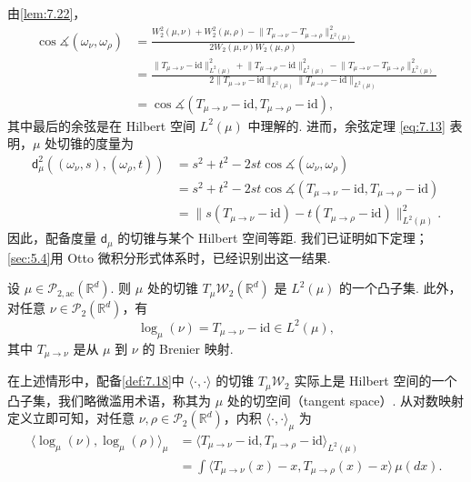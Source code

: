 由\autoref{lem:7.22}，
\begin{equation}\label{eq:7.17}
\begin{aligned}
\cos\measuredangle(\omega_\nu,\omega_\rho)
&=\frac{W_2^2(\mu,\nu)+W_2^2(\mu,\rho)-\lVert T_{\mu\to\nu}-T_{\mu\to\rho}\rVert_{L^2(\mu)}^2}{2W_2(\mu,\nu)W_2(\mu,\rho)}\\
&=\frac{\lVert T_{\mu\to\nu}-\mathrm{id}\rVert_{L^2(\mu)}^2+\lVert T_{\mu\to\rho}-\mathrm{id}\rVert_{L^2(\mu)}^2-\lVert T_{\mu\to\nu}-T_{\mu\to\rho}\rVert_{L^2(\mu)}^2}{2\lVert T_{\mu\to\nu}-\mathrm{id}\rVert_{L^2(\mu)}\lVert T_{\mu\to\rho}-\mathrm{id}\rVert_{L^2(\mu)}}\\
&=\cos\measuredangle(T_{\mu\to\nu}-\mathrm{id},T_{\mu\to\rho}-\mathrm{id}),
\end{aligned}
\end{equation}
其中最后的余弦是在 Hilbert 空间 $L^2(\mu)$ 中理解的. 进而，余弦定理 \eqref{eq:7.13} 表明，$\mu$ 处切锥的度量为
$$\begin{aligned}
\mathsf d_\mu^2((\omega_\nu,s),(\omega_\rho,t))
&=s^2+t^2-2st\cos\measuredangle(\omega_\nu,\omega_\rho)\\
&=s^2+t^2-2st\cos\measuredangle(T_{\mu\to\nu}-\mathrm{id},T_{\mu\to\rho}-\mathrm{id})\\
&=\lVert s(T_{\mu\to\nu}-\mathrm{id})-t(T_{\mu\to\rho}-\mathrm{id})\rVert_{L^2(\mu)}^2.
\end{aligned}$$
因此，配备度量 $\mathsf d_\mu$ 的切锥与某个 Hilbert 空间等距. 我们已证明如下定理；\autoref{sec:5.4}用 Otto 微积分形式体系时，已经识别出这一结果.
\begin{theorem}\label{thm:7.23}
设 $\mu\in\mathcal P_{2,\mathrm{ac}}(\mathbb R^d)$. 则 $\mu$ 处的切锥 $T_\mu\mathcal W_2(\mathbb R^d)$ 是 $L^2(\mu)$ 的一个凸子集. 此外，对任意 $\nu\in\mathcal P_2(\mathbb R^d)$，有
$$\log_\mu(\nu)=T_{\mu\to\nu}-\mathrm{id}\in L^2(\mu),$$
其中 $T_{\mu\to\nu}$ 是从 $\mu$ 到 $\nu$ 的 Brenier 映射.
\end{theorem}
在上述情形中，配备\autoref{def:7.18}中 $\langle\cdot,\cdot\rangle$ 的切锥 $T_\mu\mathcal W_2$ 实际上是 Hilbert 空间的一个凸子集，我们略微滥用术语，称其为 $\mu$ 处的切空间（tangent space）. 从对数映射定义立即可知，对任意 $\nu,\rho\in\mathcal P_2(\mathbb R^d)$，内积 $\langle\cdot,\cdot\rangle_\mu$ 为
$$\begin{aligned}
\langle\log_\mu(\nu),\log_\mu(\rho)\rangle_\mu
&=\langle T_{\mu\to\nu}-\mathrm{id},T_{\mu\to\rho}-\mathrm{id}\rangle_{L^2(\mu)}\\
&=\int\langle T_{\mu\to\nu}(x)-x,T_{\mu\to\rho}(x)-x\rangle\,\mu(dx).
\end{aligned}$$

